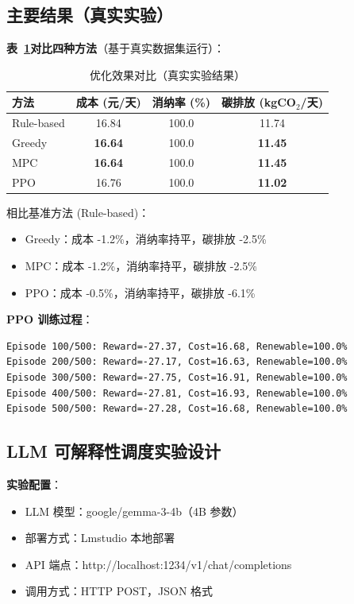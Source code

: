 \documentclass[12pt,a4paper]{article}
\begin{document}
\subsection{主要结果（真实实验）}

\textbf{表~\ref{tab:comparison}对比四种方法}（基于真实数据集运行）：

\begin{table}[h]
\centering
\caption{优化效果对比（真实实验结果）}
\label{tab:comparison}
\begin{tabular}{@{}lccc@{}}
\toprule
\textbf{方法} & \textbf{成本 (元/天)} & \textbf{消纳率 (\%)} & \textbf{碳排放 (kgCO$_2$/天)} \\
\midrule
Rule-based & 16.84 & 100.0 & 11.74 \\
Greedy & \textbf{16.64} & 100.0 & \textbf{11.45} \\
MPC & \textbf{16.64} & 100.0 & \textbf{11.45} \\
PPO & 16.76 & 100.0 & \textbf{11.02} \\
\bottomrule
\end{tabular}
\end{table}

相比基准方法 (Rule-based)：
\begin{itemize}
    \item Greedy：成本 -1.2\%，消纳率持平，碳排放 -2.5\%
    \item MPC：成本 -1.2\%，消纳率持平，碳排放 -2.5\%
    \item PPO：成本 -0.5\%，消纳率持平，碳排放 -6.1\%
\end{itemize}

\textbf{PPO 训练过程}：
\begin{verbatim}
Episode 100/500: Reward=-27.37, Cost=16.68, Renewable=100.0%
Episode 200/500: Reward=-27.17, Cost=16.63, Renewable=100.0%
Episode 300/500: Reward=-27.75, Cost=16.91, Renewable=100.0%
Episode 400/500: Reward=-27.81, Cost=16.93, Renewable=100.0%
Episode 500/500: Reward=-27.28, Cost=16.68, Renewable=100.0%
\end{verbatim}

\subsection{LLM 可解释性调度实验设计}

\textbf{实验配置}：
\begin{itemize}
    \item LLM 模型：google/gemma-3-4b（4B 参数）
    \item 部署方式：Lmstudio 本地部署
    \item API 端点：http://localhost:1234/v1/chat/completions
    \item 调用方式：HTTP POST，JSON 格式
\end{itemize}
\end{document}
